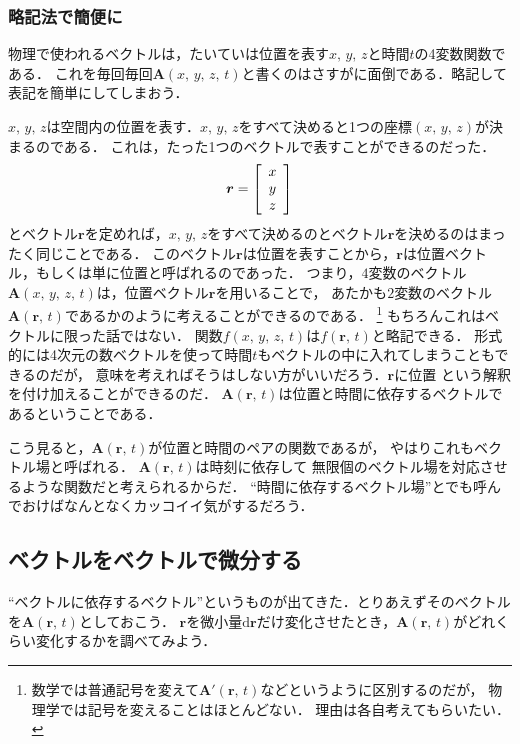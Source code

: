 \subsubsection{略記法で簡便に}
物理で使われるベクトルは，たいていは位置を表す$x, \, y, \, z$と時間$t$の4変数関数である．
これを毎回毎回$\bm{A}(x, \, y, \, z, \, t)$と書くのはさすがに面倒である．略記して表記を簡単にしてしまおう．

$x, \, y, \, z$は空間内の位置を表す．$x, \, y, \, z$をすべて決めると1つの座標$(x, \, y, \, z)$が決まるのである．
これは，たった1つのベクトルで表すことができるのだった．
$$
\bm{r} = \left[
\renewcommand{\arraystretch}{1}
\begin{array}{c}
x \\
y \\
z
\end{array}
\right]
$$
とベクトル$\bm{r}$を定めれば，$x, \, y, \, z$をすべて決めるのとベクトル$\bm{r}$を決めるのはまったく同じことである．
このベクトル$\bm{r}$は位置を表すことから，$\bm{r}$は位置ベクトル，もしくは単に位置と呼ばれるのであった．
つまり，$4$変数のベクトル$\bm{A}(x, \, y, \, z, \, t)$は，位置ベクトル$\bm{r}$を用いることで，
あたかも$2$変数のベクトル$\bm{A}(\bm{r}, \, t)$であるかのように考えることができるのである．
\footnote{数学では普通記号を変えて$\bm{A}'(\bm{r}, \, t)$などというように区別するのだが，
物理学では記号を変えることはほとんどない．
理由は各自考えてもらいたい．}
もちろんこれはベクトルに限った話ではない．
関数$f(x, \, y, \, z, \, t)$は$f(\bm{r}, \, t)$と略記できる．
形式的には4次元の数ベクトルを使って時間$t$もベクトルの中に入れてしまうこともできるのだが，
意味を考えればそうはしない方がいいだろう．$\bm{r}$に位置
という解釈を付け加えることができるのだ．
$\bm{A}(\bm{r}, \, t)$は位置と時間に依存するベクトルであるということである．

こう見ると，$\bm{A} (\bm{r} , \, t)$が位置と時間のペアの関数であるが，
やはりこれもベクトル場と呼ばれる．
$\bm{A} (\bm{r} , \, t)$は時刻に依存して
無限個のベクトル場を対応させるような関数だと考えられるからだ．
``時間に依存するベクトル場''とでも呼んでおけばなんとなくカッコイイ気がするだろう．

\subsection{ベクトルをベクトルで微分する}
``ベクトルに依存するベクトル''というものが出てきた．とりあえずそのベクトルを$\bm{A}(\bm{r}, \, t)$としておこう．
$\bm{r}$を微小量$\mathrm{d}\bm{r}$だけ変化させたとき，$\bm{A}(\bm{r}, \, t)$がどれくらい変化するかを調べてみよう．

